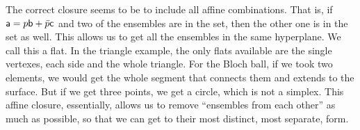 The correct closure seems to be to include all affine combinations. That is, if $\ens[a] = p \ens[b] + \bar{p} \ens[c]$ and two of the ensembles are in the set, then the other one is in the set as well. This allows us to get all the ensembles in the same hyperplane. We call this a flat. In the triangle example, the only flats available are the single vertexes, each side and the whole triangle. For the Bloch ball, if we took two elements, we would get the whole segment that connects them and extends to the surface. But if we get three points, we get a circle, which is not a simplex. This affine closure, essentially, allows us to remove ``ensembles from each other'' as much as possible, so that we can get to their most distinct, most separate, form.


